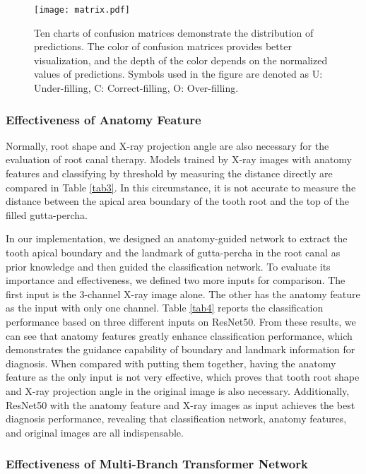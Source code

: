 \documentclass[journal]{IEEEtran}
\begin{document}
\begin{figure*}[ht]
\centering
  \texttt{[image: matrix.pdf]}
  \caption{Ten charts of confusion matrices demonstrate the distribution of predictions. The color of confusion matrices provides better visualization, and the depth of the color depends on the normalized values of predictions. Symbols used in the figure are denoted as U: Under-filling, C: Correct-filling, O: Over-filling.}
  \label{fig:matrix}
\end{figure*}

\subsubsection{Effectiveness of Anatomy Feature}
Normally, root shape and X-ray projection angle are also necessary for the evaluation of root canal therapy. Models trained by X-ray images with anatomy features and classifying by threshold by measuring the distance directly are compared in \textcolor[rgb]{0,0.541,0.855}{Table \ref{tab3}}. In this circumstance, it is not accurate to measure the distance between the apical area boundary of the tooth root and the top of the filled gutta-percha. 

In our implementation, we designed an anatomy-guided network to extract the tooth apical boundary and the landmark of gutta-percha in the root canal as prior knowledge and then guided the classification network. To evaluate its importance and effectiveness, we defined two more inputs for comparison. The first input is the 3-channel X-ray image alone. The other has the anatomy feature as the input with only one channel. \textcolor[rgb]{0,0.541,0.855}{Table \ref{tab4}} reports the classification performance based on three different inputs on ResNet50. From these results, we can see that anatomy features greatly enhance classification performance, which demonstrates the guidance capability of boundary and landmark information for diagnosis. When compared with putting them together, having the anatomy feature as the only input is not very effective, which proves that tooth root shape and X-ray projection angle in the original image is also necessary. Additionally, ResNet50 with the anatomy feature and X-ray images as input achieves the best diagnosis performance, revealing that classification network, anatomy features, and original images are all indispensable.






\subsubsection{Effectiveness of Multi-Branch Transformer Network}
\end{document}
